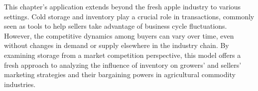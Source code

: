 \documentclass[12pt,authoryear, notitlepage]{elegantpaper}
\begin{document}
This chapter's application extends beyond the fresh apple industry to various settings. Cold storage and inventory play a crucial role in transactions, commonly seen as tools to help sellers take advantage of business cycle fluctuations. However, the competitive dynamics among buyers can vary over time, even without changes in demand or supply elsewhere in the industry chain. By examining storage from a market competition perspective, this model offers a fresh approach to analyzing the influence of inventory on growers' and sellers' marketing strategies and their bargaining powers in agricultural commodity industries.












\newpage


\appendix



\newpage

\end{document}
